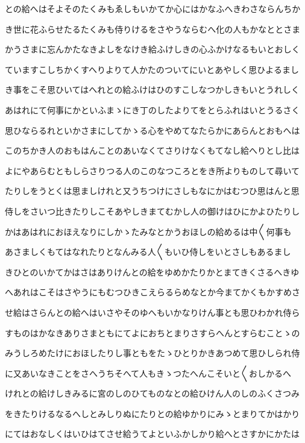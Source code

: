 \documentclass[a4paper,11pt,landscape]{ltjtarticle}
\begin{document}
との給へはそよそのたくみもゑしもいかてか心にはかなふへきわさならんちか
\par\medskip
き世に花ふらせたるたくみも侍りけるをさやうならむへ化の人もかなととさま
\par\medskip
かうさまに忘んかたなきよしをなけき給ふけしきの心ふかけなるもいとおしく
\par\medskip
ていますこしちかくすへりよりて人かたのついてにいとあやしく思ひよるまし
\par\medskip
き事をこそ思ひいてはへれとの給ふけはひのすこしなつかしきもいとうれしく
\par\medskip
あはれにて何事にかといふまゝにき丁のしたよりてをとらふれはいとうるさく
\par\medskip
思ひならるれといかさまにしてかゝる心をやめてなたらかにあらんとおもへは
\par\medskip
このちかき人のおもはんことのあいなくてさりけなくもてなし給へりとし比は
\par\medskip
よにやあらむともしらさりつる人のこのなつころとをき所よりものして尋いて
\par\medskip
たりしをうとくは思ましけれと又うちつけにさしもなにかはむつひ思はんと思
\par\medskip
侍しをさいつ比きたりしこそあやしきまてむかし人の御けはひにかよひたりし
\par\medskip
かはあはれにおほえなりにしかゝたみなとかうおほしの給めるは中〱何事も
\par\medskip
あさましくもてはなれたりとなんみる人〱もいひ侍しをいとさしもあるまし
\par\medskip
きひとのいかてかはさはありけんとの給をゆめかたりかとまてきくさるへきゆ
\par\medskip
へあれはこそはさやうにもむつひきこえらるらめなとか今まてかくもかすめさ
\par\medskip
せ給はさらんとの給へはいさやそのゆへもいかなりけん事とも思ひわかれ侍ら
\par\medskip
すものはかなきありさまともにてよにおちとまりさすらへんとすらむことゝの
\par\medskip
みうしろめたけにおほしたりし事ともをたゝひとりかきあつめて思ひしられ侍
\par\medskip
に又あいなきことをさへうちそへて人もきゝつたへんこそいと〱おしかるへ
\par\medskip
けれとの給けしきみるに宮のしのひてものなとの給ひけん人のしのふくさつみ
\par\medskip
をきたりけるなるへしとみしりぬにたりとの給ゆかりにみゝとまりてかはかり
\par\medskip
にてはおなしくはいひはてさせ給うてよといふかしかり給へとさすかにかたは
\end{document}
